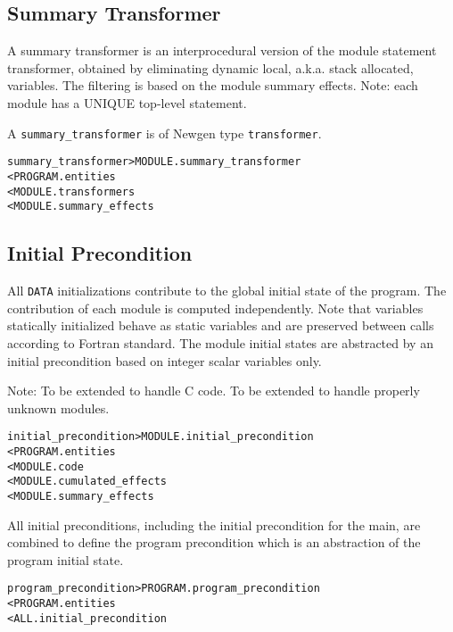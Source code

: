 \documentclass[a4paper]{report}
\newenvironment{PipsMake}{\begin{alltt}}{\end{alltt}}
\begin{document}
\subsection{Summary Transformer}
\label{subsubsection-summary-transformer}

A summary transformer is an interprocedural version of the module
statement transformer, obtained by eliminating dynamic local,
a.k.a. stack allocated, variables. The filtering is based on the
module summary effects. Note: each module has a UNIQUE top-level
statement.

A \verb+summary_transformer+ is of Newgen type \texttt{transformer}.

\begin{PipsMake}
summary_transformer             > MODULE.summary_transformer
        < PROGRAM.entities
        < MODULE.transformers
        < MODULE.summary_effects
\end{PipsMake}

\subsection{Initial Precondition}
\label{subsubsection-initial-precs}

All \texttt{DATA} initializations contribute to the global initial state
of the program. The contribution of each module is computed independently.
Note that variables statically initialized behave as static variables and
are preserved between calls according to Fortran standard. The module
initial states are abstracted by an initial precondition based on integer
scalar variables only.

Note: To be extended to handle C code. To be extended to handle properly
unknown modules.

\begin{PipsMake}
initial_precondition     > MODULE.initial_precondition
        < PROGRAM.entities
        < MODULE.code
        < MODULE.cumulated_effects
        < MODULE.summary_effects
\end{PipsMake}

All initial preconditions, including the initial precondition for the
main, are combined to define the program precondition which is an
abstraction of the program initial state.

\begin{PipsMake}
program_precondition     > PROGRAM.program_precondition
        < PROGRAM.entities
        < ALL.initial_precondition
\end{PipsMake}
\end{document}
